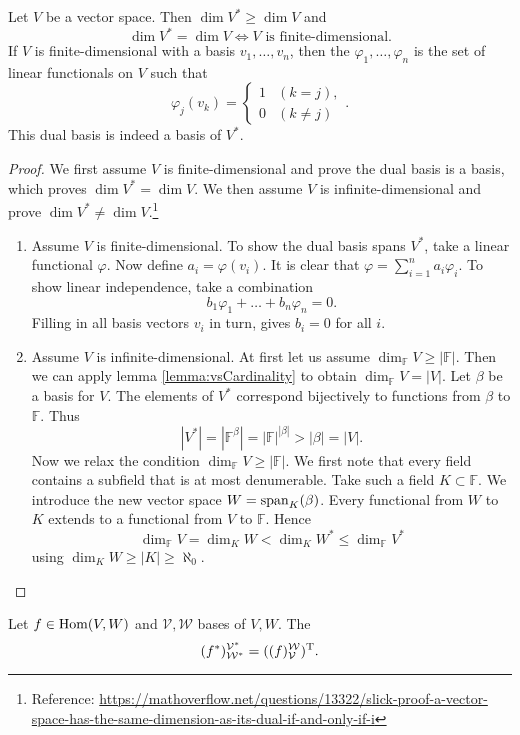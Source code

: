 \begin{proposition} \label{prop:dualBasisDimension}
Let $V$ be a vector space. Then $\dim V^* \geq \dim V$ and
\[ \dim V^* = \dim V \iff \text{$V$ is finite-dimensional}. \]
If $V$ is finite-dimensional with a basis $v_1, \ldots, v_n$, then the  $\varphi_1, \ldots, \varphi_n$ is the set of linear functionals on $V$ such that
\[ \varphi_j(v_k) = \begin{cases}
1 & (k=j), \\ 0 & (k\neq j)
\end{cases}. \]
This dual basis is indeed a basis of $V^*$.
\end{proposition}
\begin{proof}
We first assume $V$ is finite-dimensional and prove the dual basis is a basis, which proves $\dim V^* = \dim V$. We then assume $V$ is infinite-dimensional and prove $\dim V^* \neq \dim V$.\footnote{Reference: \url{https://mathoverflow.net/questions/13322/slick-proof-a-vector-space-has-the-same-dimension-as-its-dual-if-and-only-if-i}}
\begin{enumerate}
\item Assume $V$ is finite-dimensional. To show the dual basis spans $V^*$, take a linear functional $\varphi$. Now define $a_i = \varphi(v_i)$. It is clear that $\varphi = \sum_{i=1}^n a_i\varphi_i$. To show linear independence, take a combination
\[ b_1\varphi_1 + \ldots +b_n\varphi_n =0. \]
Filling in all basis vectors $v_i$ in turn, gives $b_i=0$ for all $i$.
\item Assume $V$ is infinite-dimensional. At first let us assume $\dim_{\mathbb{F}}V \geq |\mathbb{F}|$. Then we can apply lemma \ref{lemma:vsCardinality} to obtain $\dim_{\mathbb{F}}V = |V|$. Let $\beta$ be a basis for $V$. The elements of $V^*$ correspond bijectively to functions from $\beta$ to $\mathbb{F}$. Thus
\[ |V^*| = |\mathbb{F}^\beta| = |\mathbb{F}|^{|\beta|} > |\beta| = |V|. \]
Now we relax the condition $\dim_{\mathbb{F}}V \geq |\mathbb{F}|$. We first note that every field contains a subfield that is at most denumerable. Take such a field $K\subset \mathbb{F}$. We introduce the new vector space $W = \operatorname{span}_K(\beta)$. Every functional from $W$ to $K$ extends to a functional from $V$ to $\mathbb{F}$. Hence
\[ \dim_\mathbb{F} V = \dim_K W < \dim_K W^* \leq \dim_{\mathbb{F}} V^* \]
using $\dim_{K}W \geq |K| \geq \aleph_0$.
\end{enumerate}
\end{proof}


\begin{proposition}
Let $f\in\operatorname{Hom}(V,W)$ and $\mathcal{V}, \mathcal{W}$ bases of $V,W$. The
\[ (f^*)^{\mathcal{V}^*}_{\mathcal{W}^*} = ((f)^{\mathcal{W}}_{\mathcal{V}})^{\mathrm{T}}. \] \label{prop:transpDual}
\end{proposition}

